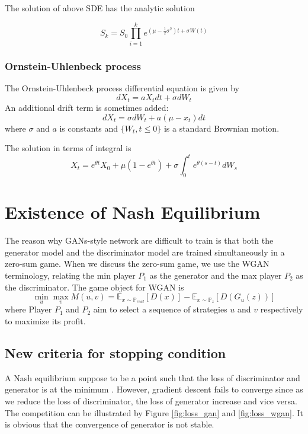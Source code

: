 \documentclass{article}
\begin{document}
	The solution of above SDE has the analytic solution
	
	\begin{equation}
	S_{k} = S_{0} \prod_{i=1}^{k}e^{\left(\mu-\frac{1}{2}\sigma^{2}\right)t+\sigma W(t)}
	\label{eq:bm_process}
	\end{equation}
	
	\subsubsection{Ornstein-Uhlenbeck process}
	The Ornstein-Uhlenbeck process differential equation is given by
	\begin{equation}
	dX_t = aX_tdt + \sigma dW_t 
	\label{eq:ornuh_diff}
	\end{equation}
	An additional drift term is sometimes added:
	\begin{equation}
	dX_t = \sigma dW_t +a (\mu-x_t)dt
	\label{eq:ornuh_diff_mean}
	\end{equation}
	where $\sigma$ and $a$ is constants and $\{W_t, t \leq 0\}$ is a standard Brownian motion.
	
	The solution in terms of integral is 
	\begin{equation}
	X_t = e^{\theta t}X_0 + \mu(1-e^{ \theta t}) +\sigma \int_{0}^{t}e^{ \theta(s-t)}dW_s
	\end{equation}
	
	\section{Existence of Nash Equilibrium}
	
	 The reason why GANs-style network are difficult to train is that both the generator model and the discriminator model are trained simultaneously in a zero-sum game.
	 When we discuss the zero-sum game, we use the WGAN terminology, relating the min player $P_{1}$ as the generator and the max player $P_{2}$ as the discriminator.
	 The game object for WGAN is 
	 \begin{equation}
	 \min_{u}\max_{v} M(u,v) =  \mathbb{E}_{x \sim \mathbb{P}_{real}}[D(x)] -\mathbb{E}_{x \sim \mathbb{P}_{z}}[D(G_{u}(z))]
	 \label{eq:wgan_dis}
	 \end{equation}
	 where Player $P_{1}$ and $P_{2}$ aim to select a sequence of strategies $u$ and $v$ respectively to maximize its profit.
	 
	 
	 
	 
	 
	 \subsection{New criteria for stopping condition}
	A Nash equilibrium suppose to be a point such that the loss of discriminator and generator is at the minimum \cite{arora}.
	However, gradient descent fails to converge since as we reduce the loss of discriminator, the loss of generator increase and vice versa. 
	The competition can be illustrated by Figure \ref{fig:loss_gan} and \ref{fig:loss_wgan}. 
	It  is obvious that the convergence of generator is not stable.  
	
\end{document}
